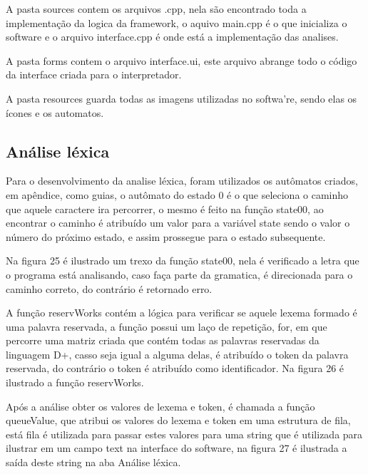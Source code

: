 \documentclass[12pt,oneside,a4paper,chapter=TITLE,section=TITLE,sumario=tradicional]{abntex2}
\begin{document}
A pasta sources contem os arquivos .cpp, nela são encontrado toda a implementação da logica da framework, o aquivo main.cpp é o que inicializa o software e o arquivo interface.cpp é onde está a implementação das analises.

A pasta forms contem o arquivo interface.ui, este arquivo abrange todo o código da interface criada para o interpretador.

A pasta resources guarda todas as imagens utilizadas no softwa're, sendo elas os ícones e os automatos.

\subsection{Análise léxica}
\label{subsec:analiselexica}

Para o desenvolvimento da analise léxica, foram utilizados os autômatos criados, em apêndice, como guias, o autômato do estado 0 é o que seleciona o caminho que aquele caractere ira percorrer, o mesmo é feito na função state00, ao encontrar o caminho é atribuído um valor para a variável state sendo o valor o número do próximo estado, e assim prossegue para o estado subsequente.

Na figura 25 é ilustrado um trexo da função state00, nela é verificado a letra que o programa está analisando, caso faça parte da gramatica, é direcionada para o caminho correto, do contrário é retornado erro.

\begin{figure}[htb]
\end{figure} 

A função reservWorks contém a lógica para verificar se aquele lexema formado é uma palavra reservada, a função possui um laço de repetição, for, em que percorre uma matriz criada que contém todas as palavras reservadas da linguagem D+, casso seja igual a alguma delas, é atribuído o token da palavra reservada, do contrário o token é atribuído como identificador. Na figura 26 é ilustrado a função reservWorks.

\begin{figure}[htb]
\end{figure} 

Após a análise obter os valores de lexema e token, é chamada a função queueValue, que atribui os valores do lexema e token em uma estrutura de fila, está fila é utilizada para passar estes valores para uma string que é utilizada para ilustrar em um campo text na interface do software, na figura 27 é ilustrada a saída deste string na aba Análise léxica.
\end{document}
